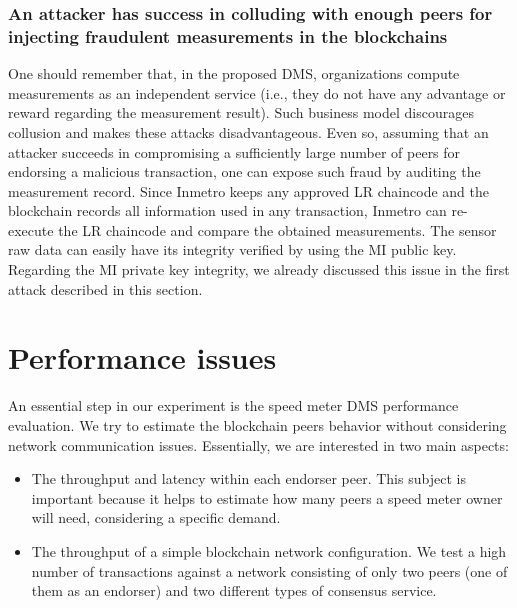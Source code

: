 \documentclass[journal]{IEEEtran}
\begin{document}
\subsubsection{An attacker has success in colluding with enough peers for injecting fraudulent measurements in the blockchains}
One should remember that, in the proposed DMS, organizations compute measurements as an independent service (i.e., they do not have any advantage or reward regarding the measurement result).
Such business model discourages collusion and makes these attacks disadvantageous.
Even so, assuming that an attacker succeeds in compromising a sufficiently large number of peers for endorsing a malicious transaction, one can expose such fraud by auditing the measurement record.
Since Inmetro keeps any approved LR chaincode and the blockchain records all information used in any transaction, Inmetro can re-execute the LR chaincode and compare the obtained measurements.
The sensor raw data can easily have its integrity verified by using the MI public key.
Regarding the MI private key integrity, we already discussed this issue in the first attack described in this section.

\section{Performance issues}
An essential step in our experiment is the speed meter DMS performance evaluation.
We try to estimate the blockchain peers behavior without considering network communication issues.
Essentially, we are interested in two main aspects:
\begin{itemize}
   \item{The throughput and latency within each endorser peer. This subject is important because it helps to estimate how many peers a speed meter owner will need, considering a specific demand.}
   \item{The throughput of a simple blockchain network configuration. We test a high number of transactions against a network consisting of only two peers (one of them as an endorser) and two different types of consensus service.}
\end{itemize}
\end{document}
